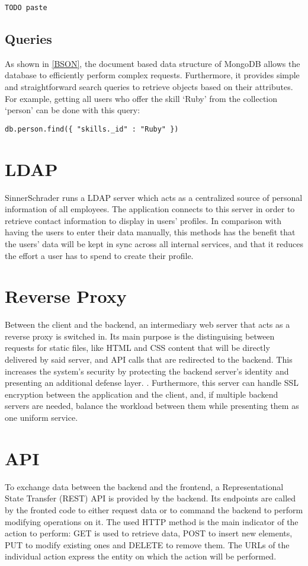 \begin{lstlisting}[language=JS]
TODO paste
\end{lstlisting}

\subsection{Queries}
As shown in \ref{BSON}, the document based data structure of MongoDB allows the database to efficiently perform complex requests. Furthermore, it provides simple and straightforward search queries to retrieve objects based on their attributes. For example, getting all users who offer the skill `Ruby' from the collection `person' can be done with this query:
\begin{lstlisting}[language=JS]
db.person.find({ "skills._id" : "Ruby" })
\end{lstlisting}

\section{LDAP}
SinnerSchrader runs a LDAP server which acts as a centralized source of personal information of all employees. The application connects to this server in order to retrieve contact information to display in users' profiles. In comparison with having the users to enter their data manually, this methods has the benefit that the users' data will be kept in sync across all internal services, and that it reduces the effort a user has to spend to create their profile.

\section{Reverse Proxy}
Between the client and the backend, an intermediary web server that acts as a reverse proxy is switched in. Its main purpose is the distinguising between requests for static files, like HTML and CSS content that will be directly delivered by said server, and API calls that are redirected to the backend. This increases the system's security by protecting the backend server's identity and presenting an additional defense layer. \cite{NGINX}. Furthermore, this server can handle SSL encryption between the application and the client, and, if multiple backend servers are needed, balance the workload between them while presenting them as one uniform service.

\section{API}
To exchange data between the backend and the frontend, a Representational State Transfer (REST) API is provided by the backend. Its endpoints are called by the fronted code to either request data or to command the backend to perform modifying operations on it.
The used HTTP method is the main indicator of the action to perform: GET is used to retrieve data, POST to insert new elements, PUT to modify existing ones and DELETE to remove them. The URLs of the individual action express the entity on which the action will be performed.

